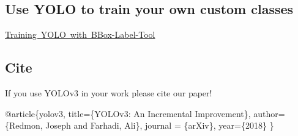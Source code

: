 \subsection*{Use Y\+O\+LO to train your own custom classes}

\mbox{\hyperlink{md_yoloTraining}{Training Y\+O\+LO with B\+Box-\/\+Label-\/\+Tool}}

\subsection*{Cite}

If you use Y\+O\+L\+Ov3 in your work please cite our paper!

@article\{yolov3, title=\{Y\+O\+L\+Ov3\+: An Incremental Improvement\}, author=\{Redmon, Joseph and Farhadi, Ali\}, journal = \{ar\+Xiv\}, year=\{2018\} \} 